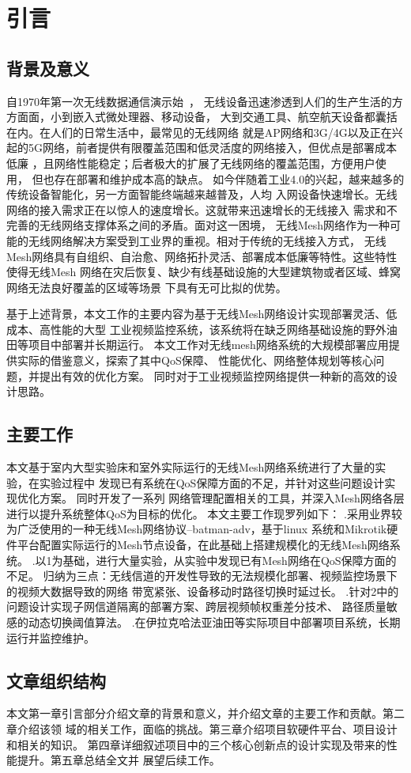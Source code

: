 \chapter{引言}
\label{cha:intro}

\section{背景及意义}
自1970年第一次无线数据通信演示始~\cite{IEEE80211}，
无线设备迅速渗透到人们的生产生活的方方面面，小到嵌入式微处理器、移动设备，
大到交通工具、航空航天设备都囊括在内。在人们的日常生活中，最常见的无线网络
就是AP网络和3G/4G以及正在兴起的5G网络，前者提供有限覆盖范围和低灵活度的网络接入，但优点是部署成本低廉
，且网络性能稳定；后者极大的扩展了无线网络的覆盖范围，方便用户使用，
但也存在部署和维护成本高的缺点。
如今伴随着工业4.0的兴起，越来越多的传统设备智能化，另一方面智能终端越来越普及，人均
入网设备快速增长。无线网络的接入需求正在以惊人的速度增长。这就带来迅速增长的无线接入
需求和不完善的无线网络支撑体系之间的矛盾。面对这一困境，
无线Mesh网络作为一种可能的无线网络解决方案受到工业界的重视。相对于传统的无线接入方式，
无线Mesh网络具有自组织、自治愈、网络拓扑灵活、部署成本低廉等特性。这些特性使得无线Mesh
网络在灾后恢复、缺少有线基础设施的大型建筑物或者区域、蜂窝网络无法良好覆盖的区域等场景
下具有无可比拟的优势。

基于上述背景，本文工作的主要内容为基于无线Mesh网络设计实现部署灵活、低成本、高性能的大型
工业视频监控系统，该系统将在缺乏网络基础设施的野外油田等项目中部署并长期运行。
本文工作对无线mesh网络系统的大规模部署应用提供实际的借鉴意义，探索了其中QoS保障、
性能优化、网络整体规划等核心问题，并提出有效的优化方案。
同时对于工业视频监控网络提供一种新的高效的设计思路。

\section{主要工作}
本文基于室内大型实验床和室外实际运行的无线Mesh网络系统进行了大量的实验，在实验过程中
发现已有系统在QoS保障方面的不足，并针对这些问题设计实现优化方案。
同时开发了一系列
网络管理配置相关的工具，并深入Mesh网络各层进行以提升系统整体QoS为目标的优化。
本文主要工作现罗列如下：
.采用业界较为广泛使用的一种无线Mesh网络协议--batman-adv，基于linux
系统和Mikrotik硬件平台配置实际运行的Mesh节点设备，在此基础上搭建规模化的无线Mesh网络系统。
.以1为基础，进行大量实验，从实验中发现已有Mesh网络在QoS保障方面的不足。
归纳为三点：无线信道的开发性导致的无法规模化部署、视频监控场景下的视频大数据导致的网络
带宽紧张、设备移动时路径切换时延过长。
.针对2中的问题设计实现子网信道隔离的部署方案、跨层视频帧权重差分技术、
路径质量敏感的动态切换阈值算法。
.在伊拉克哈法亚油田等实际项目中部署项目系统，长期运行并监控维护。

\section{文章组织结构}
本文第一章引言部分介绍文章的背景和意义，并介绍文章的主要工作和贡献。第二章介绍该领
域的相关工作，面临的挑战。第三章介绍项目软硬件平台、项目设计和相关的知识。
第四章详细叙述项目中的三个核心创新点的设计实现及带来的性能提升。第五章总结全文并
展望后续工作。



